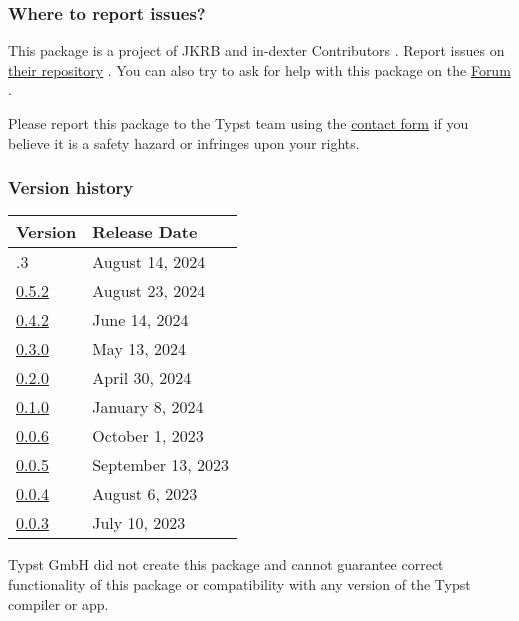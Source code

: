 \subsubsection{Where to report issues?}\label{where-to-report-issues}

This package is a project of JKRB and in-dexter Contributors . Report
issues on \href{https://github.com/RolfBremer/in-dexter}{their
repository} . You can also try to ask for help with this package on the
\href{https://forum.typst.app}{Forum} .

Please report this package to the Typst team using the
\href{https://typst.app/contact}{contact form} if you believe it is a
safety hazard or infringes upon your rights.

\label{versions}
\subsubsection{Version history}\label{version-history}

\begin{longtable}[]{@{}ll@{}}
\toprule\noalign{}
Version & Release Date \\
\midrule\noalign{}
\endhead
\bottomrule\noalign{}
\endlastfoot
0.5.3 & August 14, 2024 \\
\href{https://typst.app/universe/package/in-dexter/0.5.2/}{0.5.2} &
August 23, 2024 \\
\href{https://typst.app/universe/package/in-dexter/0.4.2/}{0.4.2} & June
14, 2024 \\
\href{https://typst.app/universe/package/in-dexter/0.3.0/}{0.3.0} & May
13, 2024 \\
\href{https://typst.app/universe/package/in-dexter/0.2.0/}{0.2.0} &
April 30, 2024 \\
\href{https://typst.app/universe/package/in-dexter/0.1.0/}{0.1.0} &
January 8, 2024 \\
\href{https://typst.app/universe/package/in-dexter/0.0.6/}{0.0.6} &
October 1, 2023 \\
\href{https://typst.app/universe/package/in-dexter/0.0.5/}{0.0.5} &
September 13, 2023 \\
\href{https://typst.app/universe/package/in-dexter/0.0.4/}{0.0.4} &
August 6, 2023 \\
\href{https://typst.app/universe/package/in-dexter/0.0.3/}{0.0.3} & July
10, 2023 \\
\end{longtable}

Typst GmbH did not create this package and cannot guarantee correct
functionality of this package or compatibility with any version of the
Typst compiler or app.


